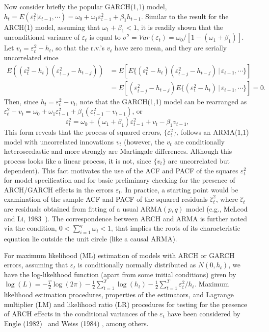 Now consider briefly the popular GARCH(1,1) model, $h_t = E(\varepsilon_t^2|\varepsilon_{t-1},\cdots) = \omega_0 + \omega_1\varepsilon_{t-1}^2 + \beta_1h_{t-1}$. Similar to the result for the ARCH(1) model, assuming that $\omega_1 + \beta_1 < 1$, it is readily shown that the unconditional variance of $\varepsilon_t$ is equal to $\sigma^2 = Var(\varepsilon_t) = \omega_0/[1 - (\omega_1 + \beta_1)]$. Let $v_t = \varepsilon_t^2 - h_t$, so that the r.v.'s $v_t$ have zero mean, and they are serially uncorrelated since
	\[
	\begin{split}
	E((\varepsilon_t^2 - h_t)(\varepsilon_{t-j}^2 - h_{t-j}))&= E[ E\{(\varepsilon_t^2 - h_t)(\varepsilon_{t-j}^2 - h_{t-j}) \,|\,\varepsilon_{t-1},\cdots\}] \\
	&= E[(\varepsilon_{t-j}^2 - h_{t-j}) E\{(\varepsilon_t^2 - h_t) \,|\,\varepsilon_{t-1},\cdots\}] = 0.
	\end{split}
	\]
Then, since $h_t = \varepsilon_t^2 - v_t$, note that the GARCH(1,1) model can be rearranged as $\varepsilon_t^2 - v_t = \omega_0 + \omega_1\varepsilon_{t-1}^2 + \beta_1(\varepsilon_{t-1}^2 - v_{t-1})$, or
	\begin{equation}\label{eqn:2ept}
	\varepsilon_t^2 = \omega_0 + (\omega_1 + \beta_1)\varepsilon_{t-1}^2 + v_t - \beta_1v_{t-1},
	\end{equation}
This form reveals that the process of squared errors, $\{\varepsilon_t^2\}$, follows an ARMA(1,1) model with uncorrelated innovations $v_t$ (however, the $v_t$ are conditionally heteroscedastic and more strongly are Martingale differences. Although this process looks like a linear process, it is not, since $ \{v_t\}$ are uncorrelated but dependent). This fact motivates the use of the ACF and PACF of the squares $\varepsilon_t^2$ for model specification and for basic preliminary checking for the presence of ARCH/GARCH effects in the errors $\varepsilon_t$. In practice, a starting point would be examination of the sample ACF and PACF of the squared residuals $\hat{\varepsilon}_t^2$, where $\hat{\varepsilon}_t$ are residuals obtained from fitting of a usual ARMA$(p,q)$ model (e.g., McLeod and Li, 1983~\cite{mcleod1983}). The correspondence between ARCH and ARMA is further noted via the condition, $0<\sum_{i=1}^q \omega_i<1$, that implies the roots of its characteristic equation lie outside the unit circle (like a causal ARMA).


For maximum likelihood (ML) estimation of models with ARCH or GARCH errors, assuming that $\varepsilon_t$ is conditionally normally distributed as $N(0,h_t)$, we have the log-likelihood function (apart from some initial conditions) given by $\log(L) = -\frac{T}{2} \log(2\pi) - \frac{1}{2}\sum_{t=1}^T \log(h_t) - \frac{1}{2}\sum_{t=1}^T \varepsilon_t^2/h_t$. Maximum likelihood estimation procedures, properties of the estimators, and Lagrange multiplier (LM) and likelihood ratio (LR) procedures for testing for the presence of ARCH effects in the conditional variances of the $\varepsilon_t$ have been considered by Engle (1982)~\cite{engle1982} and Weiss (1984) \cite{weiss1984}, among others.


